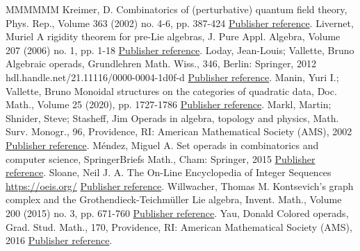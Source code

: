 \begin{thebibliography}{MMMMMM}
 Kreimer, D. Combinatorics of (perturbative) quantum field theory, Phys. Rep., Volume 363 (2002) no. 4-6, pp. 387-424 \href{https://alco.centre-mersenne.org/articles/10.5802/alco.442/#Kreimer:2000ja}{Publisher reference}.
 Livernet, Muriel A rigidity theorem for pre-Lie algebras, J. Pure Appl. Algebra, Volume 207 (2006) no. 1, pp. 1-18 \href{https://alco.centre-mersenne.org/articles/10.5802/alco.442/#Liv06}{Publisher reference}.
 Loday, Jean-Louis; Vallette, Bruno Algebraic operads, Grundlehren Math. Wiss., 346, Berlin: Springer, 2012 hdl.handle.net/21.11116/0000-0004-1d0f-d \href{https://alco.centre-mersenne.org/articles/10.5802/alco.442/#LV12}{Publisher reference}.
 Manin, Yuri I.; Vallette, Bruno Monoidal structures on the categories of quadratic data, Doc. Math., Volume 25 (2020), pp. 1727-1786 \href{https://alco.centre-mersenne.org/articles/10.5802/alco.442/#MV19}{Publisher reference}.
 Markl, Martin; Shnider, Steve; Stasheff, Jim Operads in algebra, topology and physics, Math. Surv. Monogr., 96, Providence, RI: American Mathematical Society (AMS), 2002 \href{https://alco.centre-mersenne.org/articles/10.5802/alco.442/#MSJ02}{Publisher reference}.
 Méndez, Miguel A. Set operads in combinatorics and computer science, SpringerBriefs Math., Cham: Springer, 2015 \href{https://alco.centre-mersenne.org/articles/10.5802/alco.442/#Men15}{Publisher reference}.
 Sloane, Neil J. A. The On-Line Encyclopedia of Integer Sequences \url{https://oeis.org/} \href{https://alco.centre-mersenne.org/articles/10.5802/alco.442/#Slo}{Publisher reference}.
 Willwacher, Thomas M. Kontsevich’s graph complex and the Grothendieck-Teichmüller Lie algebra, Invent. Math., Volume 200 (2015) no. 3, pp. 671-760 \href{https://alco.centre-mersenne.org/articles/10.5802/alco.442/#Wil05}{Publisher reference}.
 Yau, Donald Colored operads, Grad. Stud. Math., 170, Providence, RI: American Mathematical Society (AMS), 2016 \href{https://alco.centre-mersenne.org/articles/10.5802/alco.442/#DY16}{Publisher reference}.
\end{thebibliography}
